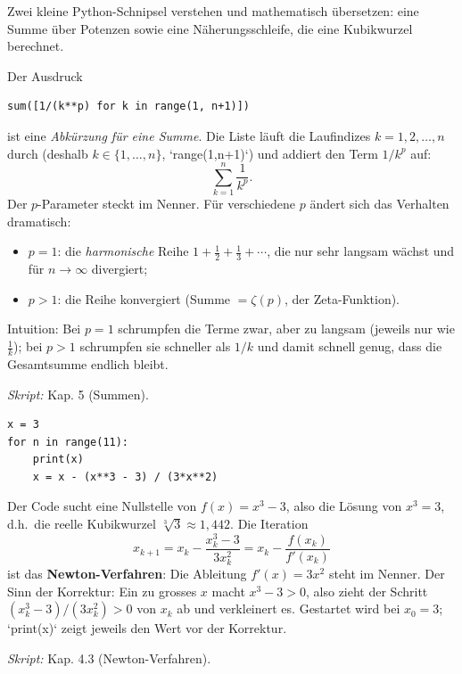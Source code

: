 

Zwei kleine Python-Schnipsel verstehen und mathematisch übersetzen: eine
Summe über Potenzen sowie eine Näherungsschleife, die eine Kubikwurzel
berechnet.

\begin{werkzeugkasten}
Der Ausdruck
\begin{verbatim}
sum([1/(k**p) for k in range(1, n+1)])
\end{verbatim}
ist eine \emph{Abkürzung für eine Summe}. Die Liste läuft die Laufindizes
$k=1,2,\ldots,n$ durch (deshalb $k\in\{1,\ldots,n\}$, `range(1,n+1)`) und
addiert den Term $1/k^p$ auf:
\begin{equation*}
  \sum_{k=1}^{n}\frac{1}{k^p}.
\end{equation*}
Der $p$-Parameter steckt im Nenner. Für verschiedene $p$ ändert sich das
Verhalten dramatisch:
\begin{itemize}
  \item $p=1$: die \emph{harmonische} Reihe $1+\tfrac12+\tfrac13+\cdots$,
        die nur sehr langsam wächst und für $n\to\infty$ divergiert;
  \item $p>1$: die Reihe konvergiert (Summe $=\zeta(p)$, der
        Zeta-Funktion).
\end{itemize}
Intuition: Bei $p=1$ schrumpfen die Terme zwar, aber zu langsam (jeweils nur
wie $\tfrac1k$); bei $p>1$ schrumpfen sie schneller als $1/k$ und damit
schnell genug, dass die Gesamtsumme endlich bleibt.

\textit{Skript:} Kap. 5 (Summen).
\end{werkzeugkasten}

\begin{werkzeugkasten}
\begin{verbatim}
x = 3
for n in range(11):
    print(x)
    x = x - (x**3 - 3) / (3*x**2)
\end{verbatim}
Der Code sucht eine Nullstelle von $f(x)=x^3-3$, also die Lösung von
$x^3=3$, d.h.\ die reelle Kubikwurzel $\sqrt[3]{3}\approx1{,}442$. Die
Iteration
\begin{equation*}
  x_{k+1}=x_k-\frac{x_k^3-3}{3x_k^2}
  =x_k-\frac{f(x_k)}{f'(x_k)}
\end{equation*}
ist das \textbf{Newton-Verfahren}: Die Ableitung $f'(x)=3x^2$ steht im
Nenner. Der Sinn der Korrektur: Ein zu grosses $x$ macht $x^3-3>0$, also
zieht der Schritt $(x_k^3-3)/(3x_k^2)>0$ von $x_k$ ab und verkleinert es.
Gestartet wird bei $x_0=3$; `print(x)` zeigt jeweils den Wert vor der
Korrektur.

\textit{Skript:} Kap. 4.3 (Newton-Verfahren).
\end{werkzeugkasten}

